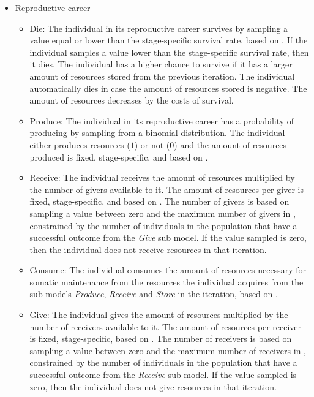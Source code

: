 \documentclass{article}
\begin{document}
\begin{itemize}
\begin{itemize}
\begin{itemize}
        \end{itemize}
    \end{itemize}
    \item Reproductive career
    \begin{itemize}
        \item Die: The individual in its reproductive career survives by sampling a value equal or lower than the stage-specific survival rate, based on \cite{gurven2007longevity}. If the individual samples a value lower than the stage-specific survival rate, then it dies. The individual has a higher chance to survive if it has a larger amount of resources stored from the previous iteration. The individual automatically dies in case the amount of resources stored is negative. The amount of resources decreases by the costs of survival.
        \item Produce: The individual in its reproductive career has a probability of producing by sampling from a binomial distribution. The individual either produces resources ($1$) or not ($0$) and the amount of resources produced is fixed, stage-specific, and based on \cite{koster2020life}.
        \item Receive: The individual receives the amount of resources multiplied by the number of givers available to it. The amount of resources per giver is fixed, stage-specific, and based on \cite{gurven2004give}. The number of givers is based on sampling a value between zero and the maximum number of givers in \cite{gurven2004give}, constrained by the number of individuals in the population that have a successful outcome from the \emph{Give} sub model. If the value sampled is zero, then the individual does not receive resources in that iteration. 
        \item Consume: The individual consumes the amount of resources necessary for somatic maintenance from the resources the individual acquires from the sub models \emph{Produce}, \emph{Receive} and \emph{Store} in the iteration, based on \cite{kaplan2000theory, pontzer2021daily}.
        \item Give: The individual gives the amount of resources multiplied by the number of receivers available to it. The amount of resources per receiver is fixed, stage-specific, based on \cite{gurven2004give}. The number of receivers is based on sampling a value between zero and the maximum number of receivers in \cite{gurven2004give}, constrained by the number of individuals in the population that have a successful outcome from the \emph{Receive} sub model. If the value sampled is zero, then the individual does not give resources in that iteration.

\end{itemize}
\end{itemize}
\end{document}
